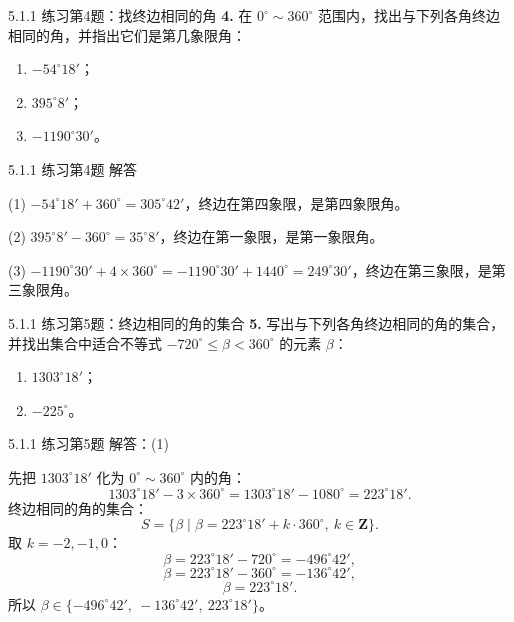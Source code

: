 \documentclass[10pt,aspectratio=169,serif]{beamer}
\begin{document}
\begin{frame}[t]{5.1.1 练习第4题：找终边相同的角}
\textbf{4.} 在 $0^\circ\sim 360^\circ$ 范围内，找出与下列各角终边相同的角，并指出它们是第几象限角：
\begin{enumerate}
  \item $-54^\circ 18'$；
  \item $395^\circ 8'$；
  \item $-1190^\circ 30'$。
\end{enumerate}
\end{frame}

\begin{frame}[t]{5.1.1 练习第4题 解答}
\begin{tcolorbox}[colback=orange!10,colframe=orange,title=\textbf{解}]
(1) $-54^\circ 18' + 360^\circ = 305^\circ 42'$，终边在第四象限，是\alert{第四象限角}。

\vspace{0.5em}
(2) $395^\circ 8' - 360^\circ = 35^\circ 8'$，终边在第一象限，是\alert{第一象限角}。

\vspace{0.5em}
(3) $-1190^\circ 30' + 4\times 360^\circ = -1190^\circ 30' + 1440^\circ = 249^\circ 30'$，终边在第三象限，是\alert{第三象限角}。
\end{tcolorbox}
\end{frame}

\begin{frame}[t]{5.1.1 练习第5题：终边相同的角的集合}
\textbf{5.} 写出与下列各角终边相同的角的集合，并找出集合中适合不等式 $-720^\circ\le \beta<360^\circ$ 的元素 $\beta$：
\begin{enumerate}
  \item $1303^\circ 18'$；
  \item $-225^\circ$。
\end{enumerate}
\end{frame}

\begin{frame}[t]{5.1.1 练习第5题 解答：(1)}
\begin{tcolorbox}[colback=orange!10,colframe=orange,title=\textbf{解：(1)}]
先把 $1303^\circ 18'$ 化为 $0^\circ\sim 360^\circ$ 内的角：
\[
1303^\circ 18' - 3\times 360^\circ = 1303^\circ 18' - 1080^\circ = 223^\circ 18'.
\]
终边相同的角的集合：
\[
S = \{\beta \mid \beta = 223^\circ 18' + k\cdot 360^\circ,\ k\in\mathbf{Z}\}.
\]
取 $k=-2,-1,0$：
\[
\beta = 223^\circ 18' - 720^\circ = -496^\circ 42',
\]
\[
\beta = 223^\circ 18' - 360^\circ = -136^\circ 42',
\]
\[
\beta = 223^\circ 18'.
\]
所以 $\beta\in \{-496^\circ 42',\ -136^\circ 42',\ 223^\circ 18'\}$。
\end{tcolorbox}
\end{frame}
\end{document}
